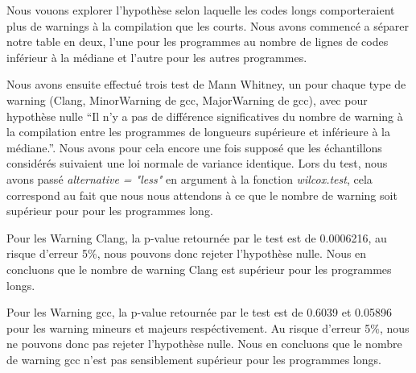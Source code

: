 Nous vouons explorer l'hypothèse selon laquelle les codes longs
comporteraient plus de warnings à la compilation que les courts. Nous
avons commencé a séparer notre table en deux, l'une pour les
programmes au nombre de lignes de codes inférieur à la médiane et
l'autre pour les autres programmes. 

Nous avons ensuite effectué trois test de Mann Whitney, un pour chaque
type de warning (Clang, MinorWarning de gcc, MajorWarning de gcc),
avec pour hypothèse nulle ``Il n'y a pas de différence significatives
du nombre de warning à la compilation entre les programmes de
longueurs supérieure et inférieure à la médiane.''. Nous avons pour
cela encore une fois supposé que les échantillons considérés suivaient
une loi normale de variance identique. Lors du test, nous avons passé
\emph{alternative = "less"} en argument à la fonction
\emph{wilcox.test}, cela correspond au fait que nous nous attendons à
ce que le nombre de warning soit supérieur pour pour les programmes
long.

Pour les Warning Clang, la p-value retournée par le test est de
0.0006216, au risque d'erreur 5\%, nous pouvons donc rejeter
l'hypothèse nulle. Nous en concluons que le nombre de warning Clang
est supérieur pour les programmes longs.

Pour les Warning gcc, la p-value retournée par le test est de 0.6039
et 0.05896 pour les warning mineurs et majeurs respéctivement. Au
risque d'erreur 5\%, nous ne pouvons donc pas rejeter l'hypothèse nulle. Nous
en concluons que le nombre de warning gcc n'est pas sensiblement supérieur pour les
programmes longs.

